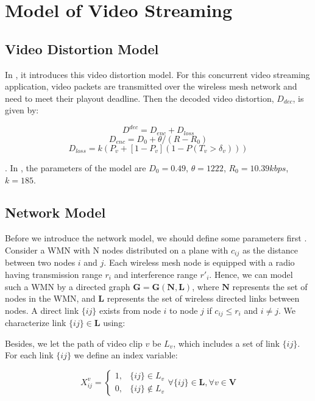 \section{Model of Video Streaming}
\subsection{Video Distortion Model}
In \cite{distortion}, it introduces this video distortion model.
For this concurrent video streaming application, video packets are
transmitted over the wireless mesh network and need to meet their
playout deadline. Then the decoded video distortion, $D_{dec}$, is
given by:

\begin{equation} D^{dec} = D_{enc} + D_{loss} \end{equation}
\begin{equation} D_{enc} = D_{0} + \theta/(R-R_{0}) \end{equation}
\begin{equation} D_{loss} = k(P_{v} + [1-P_{v}](1-P(T_v>\delta_v))) \end{equation}

. In \cite{distortion}, the parameters of the model are
$D_0=0.49$, $\theta=1222$, $R_0=10.39kbps$, $k=185$.

\subsection{Network Model}
Before we introduce the network model, we should define some
parameters first \cite{belair,GA,fixed}. Consider a WMN with N
nodes distributed on a plane with $c_{ij}$ as the distance between
two nodes $i$ and $j$. Each wireless mesh node is equipped with a
radio having transmission range $r_i$ and interference range
$r'_i$. Hence, we can model such a WMN by a directed graph
$\mathbf{G=G(N,L)}$, where $\mathbf{N}$ represents the set of
nodes in the WMN, and $\mathbf{L}$ represents the set of wireless
directed links between nodes. A direct link $\lbrace ij \rbrace$
exists from node $i$ to node $j$ if $c_{ij} \le r_{i}$ and $i \ne
j$. We characterize link $\lbrace ij \rbrace \in \mathbf{L}$
using:

Besides, we let the path of video clip $v$ be $L_v$, which
includes a set of link $\lbrace ij \rbrace$. For each link
$\lbrace ij \rbrace$ we define an index variable:

\begin{equation}
X_{ij}^v = \left\{\begin{array}{ll}
  1,  & \lbrace ij \rbrace \in L_v\\
  0,  & \lbrace ij \rbrace \notin L_v
\end{array} \right. \forall \lbrace ij \rbrace \in \mathbf{L}, \forall v \in
\mathbf{V}
\end{equation}

